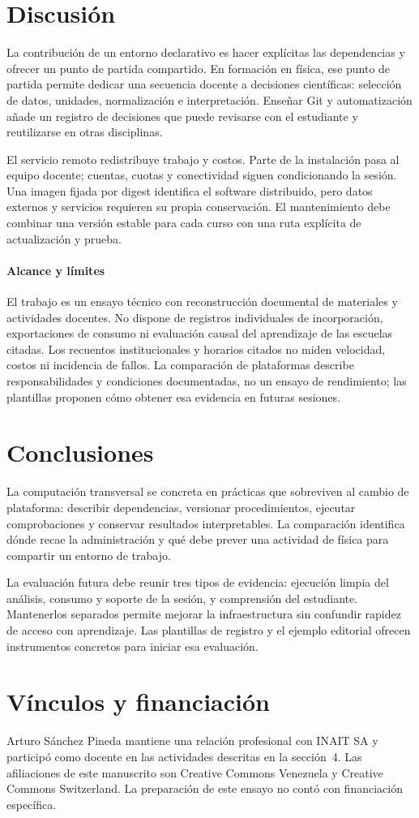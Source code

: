 \section{Discusión}
La contribución de un entorno declarativo es hacer explícitas las dependencias y ofrecer un punto de partida compartido. En formación en física, ese punto de partida permite dedicar una secuencia docente a decisiones científicas: selección de datos, unidades, normalización e interpretación. Enseñar Git y automatización añade un registro de decisiones que puede revisarse con el estudiante y reutilizarse en otras disciplinas.

El servicio remoto redistribuye trabajo y costos. Parte de la instalación pasa al equipo docente; cuentas, cuotas y conectividad siguen condicionando la sesión. Una imagen fijada por digest identifica el software distribuido, pero datos externos y servicios requieren su propia conservación. El mantenimiento debe combinar una versión estable para cada curso con una ruta explícita de actualización y prueba.

\paragraph{Alcance y límites} El trabajo es un ensayo técnico con reconstrucción documental de materiales y actividades docentes. No dispone de registros individuales de incorporación, exportaciones de consumo ni evaluación causal del aprendizaje de las escuelas citadas. Los recuentos institucionales y horarios citados no miden velocidad, costos ni incidencia de fallos. La comparación de plataformas describe responsabilidades y condiciones documentadas, no un ensayo de rendimiento; las plantillas proponen cómo obtener esa evidencia en futuras sesiones.

\section{Conclusiones}
La computación transversal se concreta en prácticas que sobreviven al cambio de plataforma: describir dependencias, versionar procedimientos, ejecutar comprobaciones y conservar resultados interpretables. La comparación identifica dónde recae la administración y qué debe prever una actividad de física para compartir un entorno de trabajo.

La evaluación futura debe reunir tres tipos de evidencia: ejecución limpia del análisis, consumo y soporte de la sesión, y comprensión del estudiante. Mantenerlos separados permite mejorar la infraestructura sin confundir rapidez de acceso con aprendizaje. Las plantillas de registro y el ejemplo editorial ofrecen instrumentos concretos para iniciar esa evaluación.

\section*{Vínculos y financiación}
Arturo Sánchez Pineda mantiene una relación profesional con INAIT SA y participó como docente en las actividades descritas en la sección~4. Las afiliaciones de este manuscrito son Creative Commons Venezuela y Creative Commons Switzerland. La preparación de este ensayo no contó con financiación específica.
